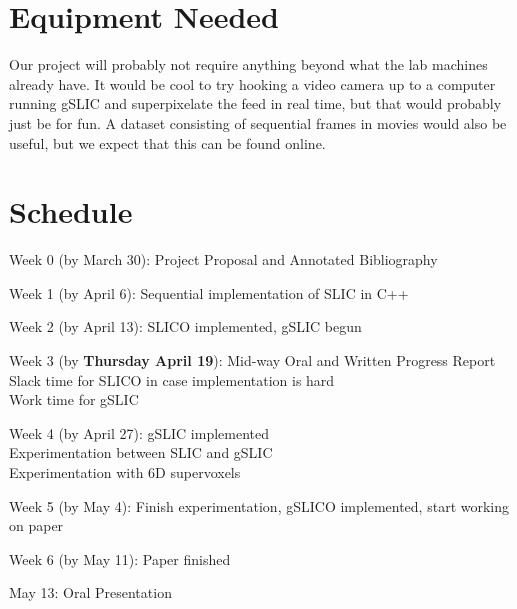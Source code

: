 \documentclass[11pt]{article}
\newenvironment{my_itemize}{
  \begin{itemize}
    \setlength{\itemsep}{1pt}
      \setlength{\parskip}{0pt}
\setlength{\parsep}{0pt}}{\end{itemize}
}
\begin{document}
\section {Equipment Needed}\label{equip}
Our project will probably not require anything beyond what the lab machines already have. It would be cool to try hooking a video camera up to a computer running gSLIC and superpixelate the feed in real time, but that would probably just be for fun. A dataset consisting of sequential frames in movies would also be useful, but we expect that this can be found online.

\section {Schedule}\label{sched}

\begin{my_itemize}
  \item Week 0 (by March 30): Project Proposal and Annotated Bibliography
  \item Week 1 (by April 6): Sequential implementation of SLIC in C++
  \item Week 2 (by April 13): SLICO implemented, gSLIC begun
  \item Week 3 (by \textbf{Thursday April 19}): Mid-way Oral and Written Progress Report \\\quad\quad Slack time for SLICO in case implementation is hard \\\quad\quad Work time for gSLIC
  \item Week 4 (by April 27): gSLIC implemented \\\quad\quad Experimentation between SLIC and gSLIC \\\quad\quad Experimentation with 6D supervoxels
  \item Week 5 (by May 4): Finish experimentation, gSLICO implemented, start working on paper
  \item Week 6 (by May 11): Paper finished
  \item May 13: Oral Presentation
\end{my_itemize}
\end{document}
